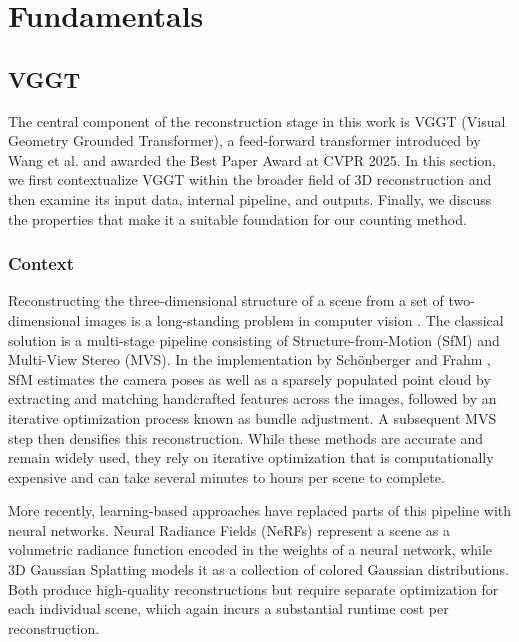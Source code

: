 \documentclass[english, egger, bsc]{vcethesis}
\begin{document}
\chapter{Fundamentals}
\section{VGGT}
The central component of the reconstruction stage in this work is VGGT (Visual Geometry Grounded Transformer), a feed-forward transformer introduced by Wang et al. \cite{wang2025vggt} and awarded the Best Paper Award at CVPR 2025. In this section, we first contextualize VGGT within the broader field of 3D reconstruction and then examine its input data, internal pipeline, and outputs. Finally, we discuss the properties that make it a suitable foundation for our counting method.

\subsection{Context}
\label{sec:vggt_classification}
Reconstructing the three-dimensional structure of a scene from a set of two-dimensional images is a long-standing problem in computer vision \cite{hartley2004multiple}. The classical solution is a multi-stage pipeline consisting of Structure-from-Motion (SfM) and Multi-View Stereo (MVS). In the implementation by Schönberger and Frahm \cite{schoenberger2016sfm}, SfM estimates the camera poses as well as a sparsely populated point cloud by extracting and matching handcrafted features across the images, followed by an iterative optimization process known as bundle adjustment. A subsequent MVS step then densifies this reconstruction. While these methods are accurate and remain widely used, they rely on iterative optimization that is computationally expensive and can take several minutes to hours per scene to complete.

More recently, learning-based approaches have replaced parts of this pipeline with neural networks. Neural Radiance Fields (NeRFs) \cite{mildenhall2020nerf} represent a scene as a volumetric radiance function encoded in the weights of a neural network, while 3D Gaussian Splatting \cite{kerbl3Dgaussians} models it as a collection of colored Gaussian distributions. Both produce high-quality reconstructions but require separate optimization for each individual scene, which again incurs a substantial runtime cost per reconstruction.
\end{document}
